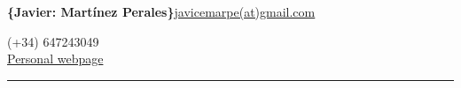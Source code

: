\documentclass{style_classes/cv}
\newcommand{\tc}[2]{\textcolor{#1}{#2}}
\begin{document}
	\begin{center}
		\begin{flushleft}
      {\Huge   {\bfseries \textcolor{whitegray}{\{}\textcolor{niceblue}{Javier}\hspace{0.5pt}:\hspace{0.5pt}\textcolor{nicegray}{ Martínez Perales}\textcolor{whitegray}{\}}}}\tc{niceblue}{\hfill\href{mailto:javicemarpe@gmail.com}{javicemarpe(at)gmail.com} }\par
    \end{flushleft}
	\tc{niceblue}{
		\hfill (+34) 647243049\\
		\hfill  \href{http://sites.google.com/view/javiermartinez/home}{Personal webpage}
	}
	\end{center}
	\vspace{-0.15in}
	\tc{niceblue}{\rule{\textwidth}{2pt}}
	\vspace{0.05in}

%
%
%


\end{document}

